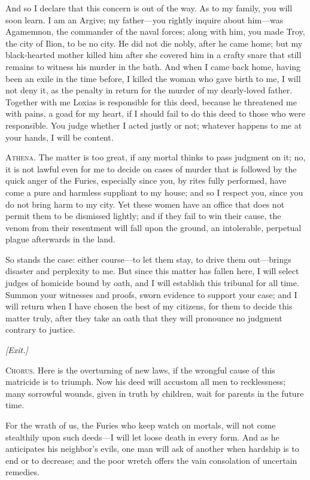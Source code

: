\documentclass[12pt]{article}
\begin{document}
And so I declare that this concern is out of the way. As to my family, you will soon learn. I am an Argive; my father---you rightly inquire about him---was Agamemnon, the commander of the naval forces; along with him, you made Troy, the city of Ilion, to be no city. He did not die nobly, after he came home; but my black-hearted mother killed him after she covered him in a crafty snare that still remains to witness his murder in the bath. And when I came back home, having been an exile in the time before, I killed the woman who gave birth to me, I will not deny it, as the penalty in return for the murder of my dearly-loved father. Together with me Loxias is responsible for this deed, because he threatened me with pains, a goad for my heart, if I should fail to do this deed to those who were responsible. You judge whether I acted justly or not; whatever happens to me at your hands, I will be content.

\textsc{Athena.} The matter is too great, if any mortal thinks to pass judgment on it; no, it is not lawful even for me to decide on cases of murder that is followed by the quick anger of the Furies, especially since you, by rites fully performed, have come a pure and harmless suppliant to my house; and so I respect you, since you do not bring harm to my city. Yet these women have an office that does not permit them to be dismissed lightly; and if they fail to win their cause, the venom from their resentment will fall upon the ground, an intolerable, perpetual plague afterwards in the land.

So stands the case: either course---to let them stay, to drive them out---brings disaster and perplexity to me. But since this matter has fallen here, I will select judges of homicide bound by oath, and I will establish this tribunal for all time. Summon your witnesses and proofs, sworn evidence to support your case; and I will return when I have chosen the best of my citizens, for them to decide this matter truly, after they take an oath that they will pronounce no judgment contrary to justice.

\begin{center}
\textit{[Exit.]}
\end{center}

\textsc{Chorus.} Here is the overturning of new laws, if the wrongful cause of this matricide is to triumph. Now his deed will accustom all men to recklessness; many sorrowful wounds, given in truth by children, wait for parents in the future time.

For the wrath of us, the Furies who keep watch on mortals, will not come stealthily upon such deeds---I will let loose death in every form. And as he anticipates his neighbor's evils, one man will ask of another when hardship is to end or to decrease; and the poor wretch offers the vain consolation of uncertain remedies.
\end{document}
